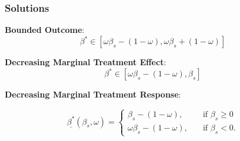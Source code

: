 \documentclass[11pt, aspectratio=169]{beamer}
\begin{document}
\begin{frame}
    \frametitle{Solutions}

    \textbf{Bounded Outcome}:
    \begin{equation*}
        \beta^* \in [\omega\beta_s - (1 - \omega), \omega\beta_s + (1 - \omega)]
    \end{equation*}

    \vspace{0.5cm}

    \pause

    \textbf{Decreasing Marginal Treatment Effect}:
    \begin{equation*}
        \beta^* \in [\omega\beta_s - (1 - \omega), \beta_s]
    \end{equation*}

    \vspace{0.5cm}
    \pause




    \textbf{Decreasing Marginal Treatment Response}:

    \begin{equation}\label{eq:solution_cs_increasing_mtr_lower}
        \underline{\beta^*}(\beta_s, \omega)=
        \begin{cases}
            \beta_s - (1 - \omega),& \quad \text{if } \beta_s \geq 0\\
            \omega \beta_s - (1 - \omega),              & \quad \text{if } \beta_s < 0.
        \end{cases}
    \end{equation}

\end{frame}
\end{document}
